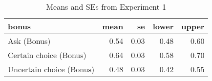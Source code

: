 \begin{table}[ht]
\centering
\caption{Means and SEs from Experiment 1} 
\label{table:prolific_means}
\begin{tabular}{lrrrr}
  \hline
bonus & mean & se & lower & upper \\ 
  \hline
Ask (Bonus) & 0.54 & 0.03 & 0.48 & 0.60 \\ 
  Certain choice (Bonus) & 0.64 & 0.03 & 0.58 & 0.70 \\ 
  Uncertain choice (Bonus) & 0.48 & 0.03 & 0.42 & 0.55 \\ 
   \hline
\end{tabular}
\end{table}
